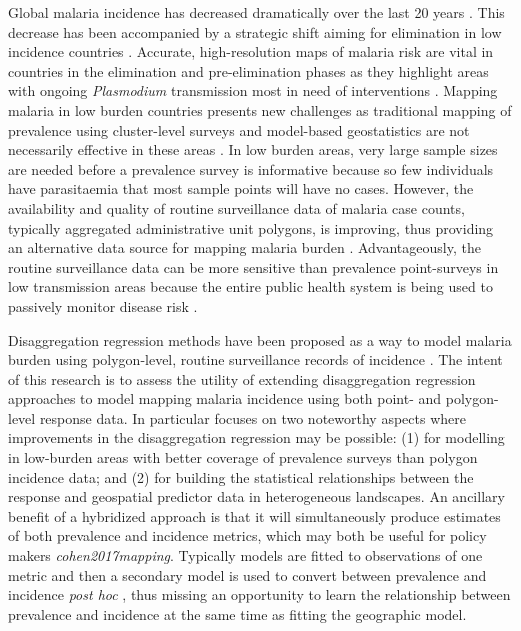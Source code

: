 \documentclass{statsoc}
\begin{document}
Global malaria incidence has decreased dramatically over the last 20 years \citep{bhatt2015effect, weiss2019mapping, battle2019mapping}.
This decrease has been accompanied by a strategic shift aiming for elimination in low incidence countries \citep{world2016world, newby2016path}.
Accurate, high-resolution maps of malaria risk are vital in countries in the elimination and pre-elimination phases as they highlight areas with ongoing \emph{Plasmodium} transmission most in need of interventions \citep{sturrock2016mapping, cohen2017mapping}.
Mapping malaria in low burden countries presents new challenges as traditional mapping of prevalence \citep{gething2011new, bhatt2017improved, gething2012long, bhatt2015effect} using cluster-level surveys and model-based geostatistics are not necessarily effective in these areas \citep{sturrock2016mapping, sturrock2014fine}.
In low burden areas, very large sample sizes are needed before a prevalence survey is informative because so few individuals have parasitaemia that most sample points will have no cases.
However, the availability and quality of routine surveillance data of malaria case counts, typically aggregated administrative unit polygons, is improving, thus providing an alternative data source for mapping malaria burden \citep{sturrock2016mapping, ohrt2015information, cibulskis2011worldwide}.
Advantageously, the routine surveillance data can be more sensitive than prevalence point-surveys in low transmission areas because the entire public health system is being used to passively monitor disease risk \citep{cibulskis2011worldwide}.

Disaggregation regression methods have been proposed as a way to model malaria burden using polygon-level, routine surveillance records of incidence \citep{sturrock2014fine, wilson2017pointless, law2018variational, taylor2017continuous, li2012log}.
The intent of this research is to assess the utility of extending disaggregation regression approaches to model mapping malaria incidence using both point- and polygon-level response data. 
In particular focuses on two noteworthy aspects where improvements in  the disaggregation regression may be possible:
(1) for modelling in low-burden areas with better coverage of prevalence surveys than polygon incidence data; and
(2) for building the statistical relationships between the response and geospatial predictor data in heterogeneous landscapes. An ancillary benefit of a hybridized approach is that it will simultaneously produce estimates of both prevalence and incidence metrics, which may both be useful for policy makers \emph{cohen2017mapping}.
Typically models are fitted to observations of one metric and then a secondary model is used to convert between prevalence and incidence \emph{post hoc} \citep{battle2019mapping, bhatt2015effect}, thus missing an opportunity to learn the relationship between prevalence and incidence at the same time as fitting the geographic model. 
\end{document}
